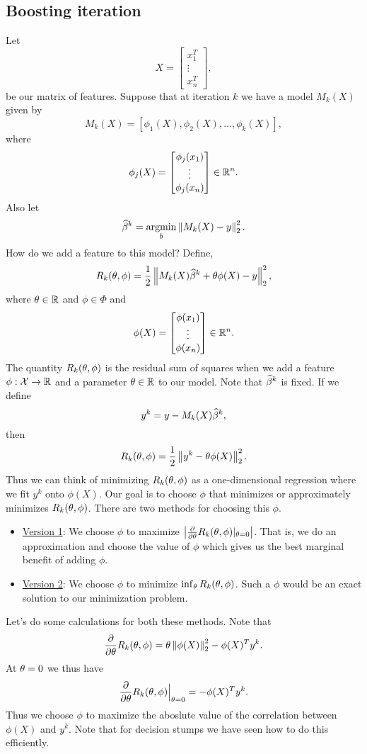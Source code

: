 \subsection{Boosting iteration}
Let 
\[X = \begin{bmatrix}
    x_1^T\\ \vdots\\ x_n^T
\end{bmatrix}, \]
be our matrix of features. Suppose that at iteration $k$ we have a model $M_k(X)$ given by 
\[M_k(X) = [\phi_1(X), \phi_2(X),\ldots, \phi_k(X)],\]
where 
\[ \phi_j(X) = \begin{bmatrix}
    \phi_j(x_1)\\ \vdots \\ \phi_j(x_n)
\end{bmatrix} \in {\mathbb R}^n.\]
Also let 
\[\widehat{\beta}^k = \operatorname*{argmin}_b \left\|M_k(X)-y\right\|_2^2.\]
How do we add a feature to this model? Define,
\[R_k({\theta},\phi) = \frac{1}{2}\left\|M_k(X)\widehat{\beta}^k + {\theta} \phi(X)-y\right\|_2^2,\]
where ${\theta} \in {\mathbb R}$ and $\phi \in \Phi$ and 
\[\phi(X) = \begin{bmatrix}
    \phi(x_1)\\ \vdots \\ \phi(x_n)
\end{bmatrix} \in {\mathbb R}^n. \]
The quantity $R_k({\theta},\phi)$ is the residual sum of squares when we add a feature $\phi : {\mathcal{X}} \to {\mathbb R}$ and a parameter ${\theta} \in {\mathbb R}$ to our model. Note that $\widehat{\beta}^k$ is fixed. If we define 
\[y^k = y-M_k(X)\widehat{\beta}^k, \]
then 
\[R_k({\theta},\phi) = \frac{1}{2}\left\|y^k - {\theta} \phi(X)\right\|_2^2. \]
Thus we can think of minimizing $R_k({\theta},\phi)$ as a one-dimensional regression where we fit $y^k$ onto $\phi(X)$. Our goal is to choose $\phi$ that minimizes or approximately minimizes $R_k({\theta},\phi)$. There are two methods for choosing this $\phi$.
\begin{itemize}
    \item \underline{Version 1}: We choose $\phi$ to maximize ${\left\lvert\frac{\partial}{\partial {\theta}}R_k({\theta},\phi)|_{{\theta} = 0}\right\rvert}$. That is, we do an approximation and choose the value of $\phi$ which gives us the best marginal benefit of adding $\phi$.
    \item \underline{Version 2}: We choose $\phi$ to minimize $\inf_{{\theta}} R_k({\theta},\phi)$. Such a $\phi$ would be an exact solution to our minimization problem.
\end{itemize}

Let's do some calculations for both these methods. Note that 
\[\frac{\partial}{\partial {\theta}} R_k({\theta},\phi) = {\theta} \left\|\phi(X)\right\|_2^2 - \phi(X)^T y^k. \]
At ${\theta} = 0$ we thus have 
\[\frac{\partial}{\partial {\theta}} R_k({\theta},\phi)\Big|_{{\theta} = 0} = -\phi(X)^T y^k. \]
Thus we choose $\phi$ to maximize the aboslute value of the correlation between $\phi(X)$ and $y^k$. Note that for decision stumps we have seen how to do this efficiently.

